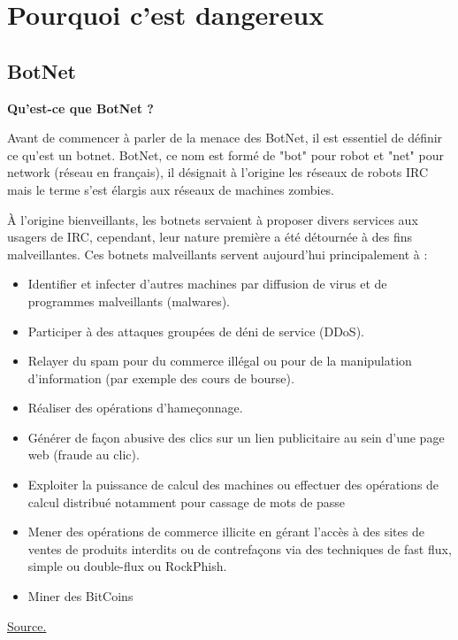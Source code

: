 \documentclass[a4paper]{report}
\begin{document}
	\newpage
	
	\section{Pourquoi c'est dangereux}
	\subsection{BotNet}
	
	\bigbreak	
	
	\begin{flushleft}
		\textbf{Qu'est-ce que BotNet ?} \\
	\end{flushleft}
	
	Avant de commencer à parler de la menace des BotNet, il est essentiel de définir ce qu'est un botnet.
	BotNet, ce nom est formé de "bot" pour robot et "net" pour network (réseau en français), il désignait à l'origine les réseaux de robots
	IRC mais le terme s'est élargis aux réseaux de machines zombies.
	
	\bigbreak
	
	À l'origine bienveillants, les botnets servaient à proposer divers services aux usagers de IRC, cependant, leur nature première a été 
	détournée à des fins malveillantes. Ces botnets malveillants servent aujourd'hui principalement à :
	\begin{itemize}
		\item Identifier et infecter d’autres machines par diffusion de virus et de programmes malveillants (malwares).
		\item Participer à des attaques groupées de déni de service (DDoS).
		\item Relayer du spam pour du commerce illégal ou pour de la manipulation d'information (par exemple des cours de bourse).
		\item Réaliser des opérations d'hameçonnage.
		\item Générer de façon abusive des clics sur un lien publicitaire au sein d’une page web (fraude au clic).
		\item Exploiter la puissance de calcul des machines ou effectuer des opérations de calcul distribué notamment pour cassage de mots 
		de passe
		\item Mener des opérations de commerce illicite en gérant l'accès à des sites de ventes de produits interdits ou de contrefaçons 
		via des techniques de fast flux, simple ou double-flux ou RockPhish.
		\item Miner des BitCoins
	\end{itemize}
	\href{https://fr.wikipedia.org/wiki/Botnet#Usages_des_botnets}{Source.}
	\bigbreak
		
\end{document}
